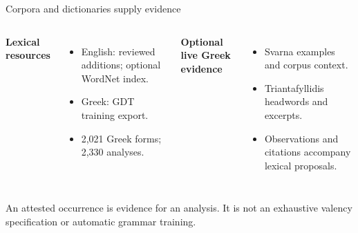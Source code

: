 \documentclass[aspectratio=169,11pt]{beamer}
\newcommand{\keypoint}[1]{\begin{block}{}#1\end{block}}
\begin{document}
\begin{frame}{Corpora and dictionaries supply evidence}
  \color{Ink}
  \begin{columns}[T,onlytextwidth]
      \textbf{Lexical resources}\medskip
      \begin{itemize}\setlength\itemsep{6pt}
        \item English: reviewed additions; optional WordNet index.
        \item Greek: GDT training export.
        \item 2,021 Greek forms; 2,330 analyses.
      \end{itemize}
      \textbf{Optional live Greek evidence}\medskip
      \begin{itemize}\setlength\itemsep{6pt}
        \item Svarna examples and corpus context.
        \item Triantafyllidis headwords and excerpts.
        \item Observations and citations accompany lexical proposals.
      \end{itemize}
  \end{columns}
  \vspace{5mm}
  \keypoint{An attested occurrence is evidence for an analysis. It is not an exhaustive valency specification or automatic grammar training.}
\end{frame}
\end{document}
